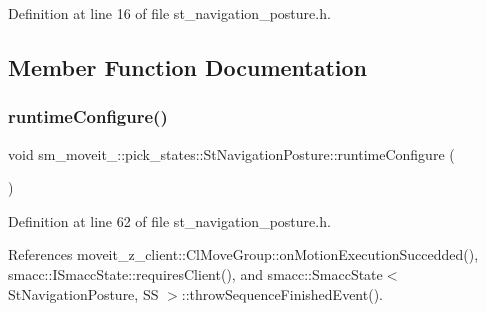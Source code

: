 Definition at line 16 of file st\+\_\+navigation\+\_\+posture.\+h.



\subsection{Member Function Documentation}
\mbox{\label{structsm__moveit__3_1_1pick__states_1_1StNavigationPosture_ac5647836bb2596454c7bb660106fc5f0}} 
\subsubsection{\texorpdfstring{runtime\+Configure()}{runtimeConfigure()}}
{\footnotesize\ttfamily void sm\+\_\+moveit\+\_\+::pick\+\_\+states\+::\+St\+Navigation\+Posture\+::runtime\+Configure (\begin{DoxyParamCaption}{ }\end{DoxyParamCaption})\hspace{0.3cm}{\ttfamily [inline]}}



Definition at line 62 of file st\+\_\+navigation\+\_\+posture.\+h.



References moveit\+\_\+z\+\_\+client\+::\+Cl\+Move\+Group\+::on\+Motion\+Execution\+Succedded(), smacc\+::\+I\+Smacc\+State\+::requires\+Client(), and smacc\+::\+Smacc\+State$<$ St\+Navigation\+Posture, S\+S $>$\+::throw\+Sequence\+Finished\+Event().


